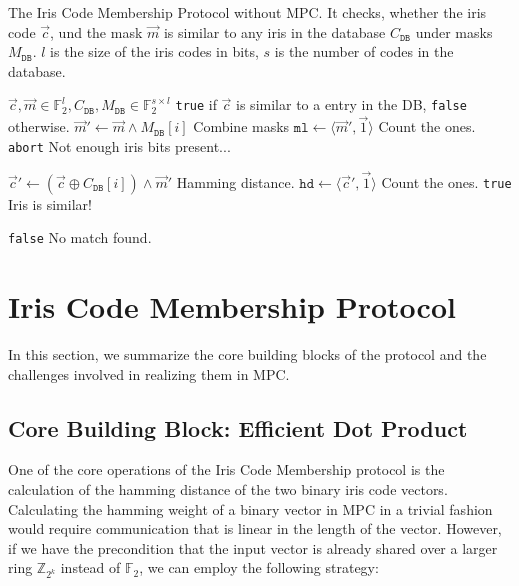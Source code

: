 \documentclass[a4paper,11pt,
]{article}
\newcommand{\F}{\ensuremath{\mathbb{F}}\xspace}
\newcommand{\Z}{\ensuremath{\mathbb{Z}}\xspace}
\begin{document}
\begin{algorithm}[ht]
    \caption{The Iris Code Membership Protocol without MPC. It checks, whether the iris code $\vec{c}$, und the mask $\vec{m}$ is similar to any iris in the database $C_\texttt{DB}$ under masks $M_\texttt{DB}$. $l$ is the size of the iris codes in bits, $s$ is the number of codes in the database. \label{alg:iris_plain}}
    \begin{algorithmic}[l]
        \Require $\vec{c}, \vec{m} \in \F_2^l, C_\texttt{DB}, M_\texttt{DB} \in \F_2^{s \times l}$
        \Ensure \texttt{true} if $\vec{c}$ is similar to a entry in the DB, \texttt{false} otherwise.
        \State $\vec{m}' \gets \vec{m} \wedge M_\texttt{DB}[i]$
        \Comment Combine masks
        \State $\texttt{ml} \gets \langle\vec{m}', \vec{1}\rangle$
        \Comment Count the ones.
        \State \Return \texttt{abort} \Comment Not enough iris bits present...
        \EndIf

        \State $\vec{c}' \gets (\vec{c} \oplus C_\texttt{DB}[i]) \wedge \vec{m}'$
        \Comment Hamming distance.
        \State $\texttt{hd} \gets \langle\vec{c}', \vec{1}\rangle$
        \Comment Count the ones.
        \State \Return \texttt{true}
        \Comment Iris is similar!
        \EndIf
        \EndFor

        \State \Return \texttt{false}
        \Comment No match found.
    \end{algorithmic}
\end{algorithm}

\section{Iris Code Membership Protocol}

In this section, we summarize the core building blocks of the protocol and the challenges involved in realizing them in MPC.

\subsection{Core Building Block: Efficient Dot Product}

One of the core operations of the Iris Code Membership protocol is the calculation of the hamming distance of the two binary iris code vectors. Calculating the hamming weight of a binary vector in MPC in a trivial fashion would require communication that is linear in the length of the vector. However, if we have the precondition that the input vector is already shared over a larger ring $\Z_{2^k}$ instead of $\F_2$, we can employ the following strategy:
\end{document}
